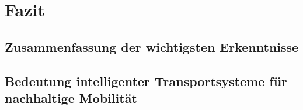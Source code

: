 \section{Fazit}
\subsection{Zusammenfassung der wichtigsten Erkenntnisse}
\subsection{Bedeutung intelligenter Transportsysteme für nachhaltige Mobilität}